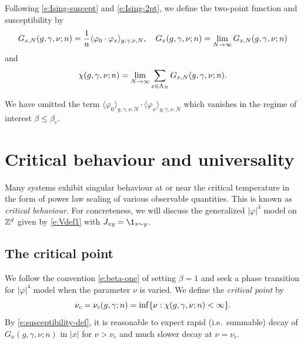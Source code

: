 Following \eqref{e:Ising-suscept} and \eqref{e:Ising-2pt}, we define the
two-point function and susceptibility by
\begin{equation}
\label{e:two-point-function-phi4}
G_{x, N}(g,\gamma,\nu; n)
	=
\frac{1}{n} \langle \varphi_0 \cdot \varphi_x \rangle_{g,\gamma,\nu,N},
	\quad
G_x(g,\gamma,\nu; n)
	=
\lim_{N \rightarrow \infty} G_{x, N}(g,\gamma,\nu; n)
\end{equation}
and
\begin{equation}
\label{e:susceptibility-def}
\chi(g, \gamma, \nu; n)
	=
\lim_{N\rightarrow\infty} \sum_{x\in\Lambda_N} G_{x,N}(g, \gamma, \nu; n).
\end{equation}

\begin{rk}
We have omitted the term
$\langle \varphi_0 \rangle_{g,\gamma,\nu,N} \cdot \langle \varphi_x \rangle_{g,\gamma,\nu,N}$
which vanishes in the regime of interest $\beta \le \beta_c$.
\end{rk}


\section{Critical behaviour and universality}
\label{sec:crit}

Many systems exhibit singular behaviour at or near the critical temperature in
the form of power law scaling of various observable quantities. This is known as
\emph{critical behaviour}. For concreteness, we will discuss the generalized
$|\varphi|^4$ model on ${ {{\mathbb Z}}^d }$ given by \eqref{e:Vdef1}
with $J_{xy} = \1_{x\sim y}$.


\subsection{The critical point}

We follow the convention \eqref{e:beta-one} of setting $\beta = 1$ and seek a
phase transition for $|\varphi|^4$ model when the parameter $\nu$ is varied.
We define the \emph{critical point} by
\begin{equation}
\nu_c = \nu_c(g, \gamma; n) = \inf \{ \nu : \chi(g, \gamma, \nu; n) < \infty \}.
\end{equation}
By \eqref{e:susceptibility-def}, it is
reasonable to expect rapid (i.e.\ summable) decay of $G_x(g, \gamma, \nu; n)$ in $|x|$ for
$\nu > \nu_c$ and much slower decay at $\nu = \nu_c$.

